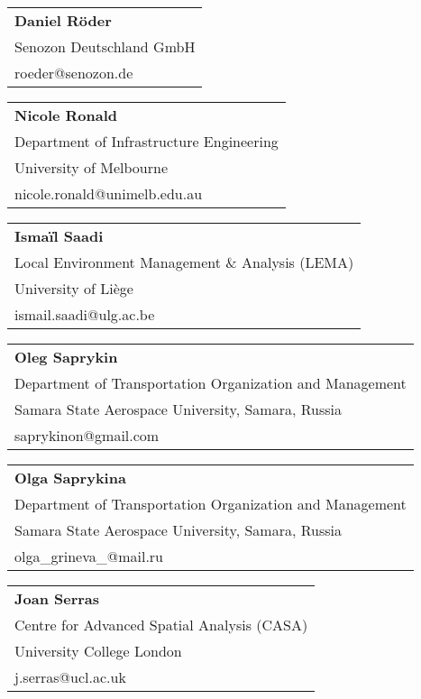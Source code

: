 \begin{tabular}[width=0.48\textwidth]{@{}l}
\textbf{Daniel Röder} \\
Senozon Deutschland GmbH \\
roeder@senozon.de \\
\end{tabular}

\begin{tabular}[width=0.48\textwidth]{@{}l}
\textbf{Nicole Ronald} \\
Department of Infrastructure Engineering \\
University of Melbourne \\
nicole.ronald@unimelb.edu.au \\
\end{tabular}

\begin{tabular}[width=0.48\textwidth]{@{}l}
\textbf{Ismaïl Saadi} \\
Local Environment Management \& Analysis (LEMA) \\
University of Liège \\
ismail.saadi@ulg.ac.be \\
\end{tabular}

\begin{tabular}[width=0.48\textwidth]{@{}l}
\textbf{Oleg Saprykin} \\
Department of Transportation Organization and Management \\
Samara State Aerospace University, Samara, Russia \\
saprykinon@gmail.com \\
\end{tabular}

\begin{tabular}[width=0.48\textwidth]{@{}l}
\textbf{Olga Saprykina} \\
Department of Transportation Organization and Management \\
Samara State Aerospace University, Samara, Russia \\
olga\_grineva\_@mail.ru \\
\end{tabular}

\begin{tabular}[width=0.48\textwidth]{@{}l}
\textbf{Joan Serras} \\
Centre for Advanced Spatial Analysis (CASA) \\
University College London \\
j.serras@ucl.ac.uk \\
\end{tabular}

